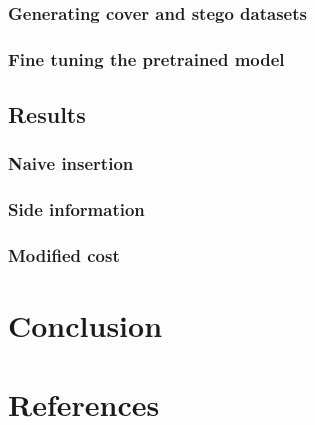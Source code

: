 \documentclass[12pt]{article}
\begin{document}
\subsubsection{Generating cover and stego datasets}

\subsubsection{Fine tuning the pretrained model}

\subsection{Results}
\subsubsection{Naive insertion}
\subsubsection{Side information}
\subsubsection{Modified cost}

\section*{Conclusion}

\section*{References}
\end{document}
